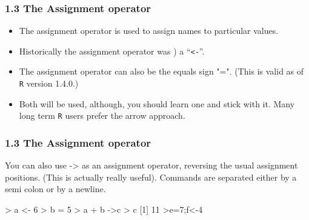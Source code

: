 \documentclass{beamer}
\begin{document}
 
 \frametitle{1.3 The Assignment operator}
 \begin{itemize}
 \item The assignment operator is used to assign names to particular values. 
 \item Historically the assignment
 operator was ) a ``\texttt{<-}”. 
 \item The assignment operator can also be the equals sign "=". (This is valid as of \texttt{R}
 version 1.4.0.)
 
 \item Both will be used, although, you should learn one and stick with it. Many long term \texttt{R}
 users prefer the arrow approach. 
 \end{itemize}
 
 
 
 \frametitle{1.3 The Assignment operator}
 
 You can also use -> as an assignment operator, reversing the
 usual assignment positions. (This is actually really useful). Commands are separated either by
 a semi colon or by a newline.
 \begin{framed}
 \begin{semiverbatim}
 > a <- 6
 > b = 5
 > a + b ->c
 > c
 [1] 11
 >e=7;f<-4
 \end{semiverbatim}
 \end{framed}
 
 
\end{document}

